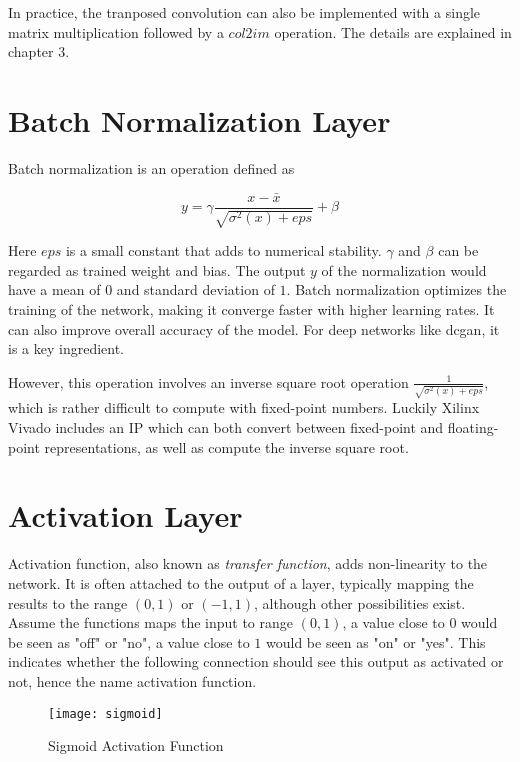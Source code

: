 In practice, the tranposed convolution can also be implemented with a single matrix multiplication
followed by a $col2im$ operation. The details are explained in chapter 3.

\section{Batch Normalization Layer}

Batch normalization is an operation defined as

\begin{equation} \label{eq:batch_normalization}
  y = \gamma \frac{x - \bar{x}}{\sqrt{\sigma^2(x) + {eps}}} + \beta
\end{equation}

Here $eps$ is a small constant that adds to numerical stability. $\gamma$ and $\beta$ can be regarded
as trained weight and bias. The output $y$ of the normalization would have a mean of $0$ and standard
deviation of $1$. Batch normalization optimizes the training of the network, making it converge
faster with higher learning rates. It can also improve overall accuracy of the model. For deep networks
like \gls{dcgan}, it is a key ingredient.

However, this operation involves an inverse square root operation $\frac{1}{\sqrt{\sigma^2(x) + eps}}$,
which is rather difficult to compute with fixed-point numbers. Luckily Xilinx Vivado includes an IP which
can both convert between fixed-point and floating-point representations, as well as compute the inverse square
root.

\section{Activation Layer}

Activation function, also known as \textit{transfer function}, adds non-linearity to the network. It is often
attached to the output of a layer, typically mapping the results to the range $(0, 1)$ or $(-1, 1)$, although
other possibilities exist. Assume the functions maps the input to range $(0, 1)$, a value close to $0$ would
be seen as "off" or "no", a value close to $1$ would be seen as "on" or "yes". This indicates whether the
following connection should see this output as activated or not, hence the name activation function.

\begin{figure}[h]
  \centering
  \texttt{[image: sigmoid]}
  \caption{Sigmoid Activation Function}
  \label{fig:sigmoid}
\end{figure}

